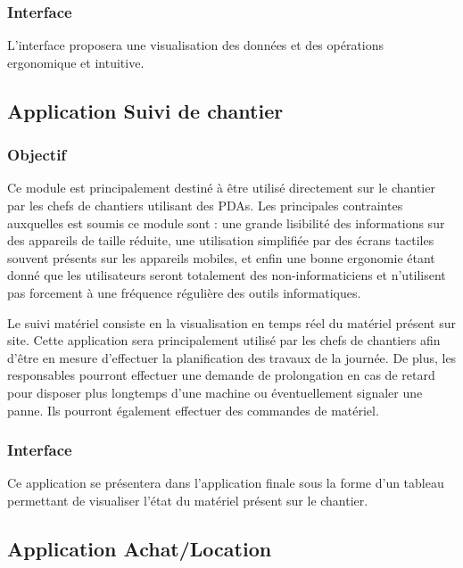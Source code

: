	    \subsubsection{Interface}
	    L'interface proposera une visualisation des données et des opérations ergonomique et intuitive.

    \subsection {Application  Suivi de chantier}
	    \subsubsection {Objectif}
	    Ce module est principalement destiné à être utilisé directement sur le chantier par les chefs de chantiers utilisant des PDAs.
    Les principales contraintes auxquelles est soumis ce module sont : une grande lisibilité des informations sur des appareils de taille réduite, une utilisation simplifiée par des écrans tactiles souvent présents sur les appareils mobiles, et enfin une bonne ergonomie étant donné que les utilisateurs
    seront totalement des non-informaticiens et n'utilisent pas forcement à une fréquence régulière des outils informatiques.

            Le suivi matériel consiste en la visualisation en temps réel du matériel présent sur site.  Cette application sera principalement utilisé par les chefs de chantiers afin d'être en mesure d'effectuer la planification des travaux de la journée.
	    De plus, les responsables pourront effectuer une demande de prolongation en cas de retard pour disposer plus longtemps d'une machine ou éventuellement signaler une panne. Ils pourront également effectuer des commandes de matériel.

	    \subsubsection {Interface}
	    Ce application se présentera dans l'application finale sous la forme d'un tableau permettant de visualiser l'état du matériel présent sur le chantier. 

    \subsection{Application Achat/Location}
